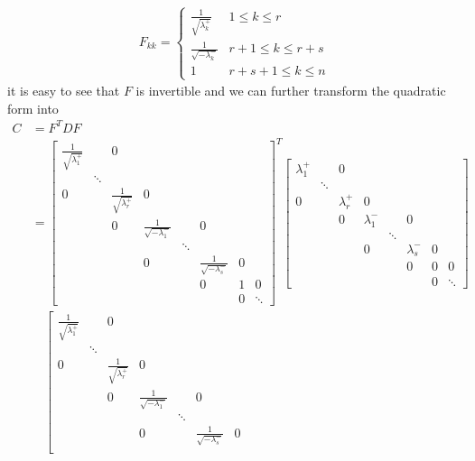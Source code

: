 \begin{align*}
F_{kk} = 
\begin{cases}
\frac{1}{\sqrt{\lambda_{k}^+}} & 1 \leq k \leq r \\
\frac{1}{\sqrt{-\lambda_{k}^-}} & r+1 \leq k \leq r+s \\
1 & r+s+1 \leq k \leq n
\end{cases}
\end{align*}
it is easy to see that $F$ is invertible and we can further transform the quadratic form into
\begin{align*}
C &= F^TDF \\
&= \left[\begin{smallmatrix}
\frac{1}{\sqrt{\lambda_{1}^+}} & & 0 & & & & &\\
 & \ddots & & & & & & \\
0 & & \frac{1}{\sqrt{\lambda_{r}^+}} & 0 & & & &\\
 & & 0 & \frac{1}{\sqrt{-\lambda_{1}^-}} & & 0 & & \\
 & & & & \ddots & & & \\
 & & & 0 & & \frac{1}{\sqrt{-\lambda_{s}^-}} & 0 &  \\
 & & & & & 0 & 1 & 0\\
 & & & & & & 0 & \ddots
\end{smallmatrix}\right]^T
\left[\begin{smallmatrix}
\lambda_1^+ & & 0 & & & & &\\
 & \ddots & & & & & & \\
0 & & \lambda_{r}^+ & 0 & & & &\\
 & & 0 & \lambda_{1}^- & & 0 & & \\
 & & & & \ddots & & & \\
 & & & 0 & & \lambda_{s}^- & 0 &  \\
 & & & & & 0 & 0 & 0\\
 & & & & & & 0 & \ddots
\end{smallmatrix}\right] \\
& \quad \left[\begin{smallmatrix}
\frac{1}{\sqrt{\lambda_{1}^+}} & & 0 & & & & &\\
 & \ddots & & & & & & \\
0 & & \frac{1}{\sqrt{\lambda_{r}^+}} & 0 & & & &\\
 & & 0 & \frac{1}{\sqrt{-\lambda_{1}^-}} & & 0 & & \\
 & & & & \ddots & & & \\
 & & & 0 & & \frac{1}{\sqrt{-\lambda_{s}^-}} & 0 &  \\

\end{smallmatrix}
\end{align*}
